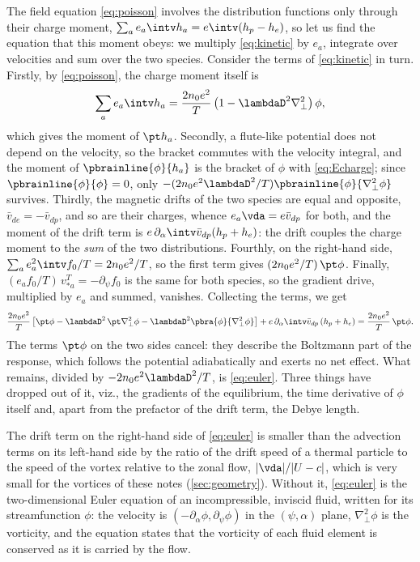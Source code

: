 The field equation \cref{eq:poisson} involves the distribution functions only through their charge moment, \(\sum_a e_a\intv h_a = e\intv(h_p - h_e)\), so let us find the equation that this moment obeys: we multiply \cref{eq:kinetic} by \(e_a\), integrate over velocities and sum over the two species. Consider the terms of \cref{eq:kinetic} in turn. Firstly, by \cref{eq:poisson}, the charge moment itself is
\begin{equation}
\sum_a e_a\intv h_a = \frac{2n_0e^2}{T}\left(1 - \lambdaD^2\nabla_\perp^2\right)\phi,
\label{eq:Echarge}
\end{equation}
which gives the moment of \(\pt h_a\). Secondly, a flute-like potential does not depend on the velocity, so the bracket commutes with the velocity integral, and the moment of \(\pbrainline{\phi}{h_a}\) is the bracket of \(\phi\) with \cref{eq:Echarge}; since \(\pbrainline{\phi}{\phi} = 0\), only \(-(2n_0e^2\lambdaD^2/T)\pbrainline{\phi}{\nabla_\perp^2\phi}\) survives. Thirdly, the magnetic drifts of the two species are equal and opposite, \(\bar v_{de} = -\bar v_{dp}\), and so are their charges, whence \(e_a\vda = e\bar v_{dp}\) for both, and the moment of the drift term is \(e\,\partial_\alpha\intv\bar v_{dp}(h_p + h_e)\): the drift couples the charge moment to the \textit{sum} of the two distributions. Fourthly, on the right-hand side, \(\sum_a e_a^2\intv f_0/T = 2n_0e^2/T\), so the first term gives \((2n_0e^2/T)\,\pt\phi\). Finally, \((e_af_0/T)\,v_{*a}^T = -\partial_\psi f_0\) is the same for both species, so the gradient drive, multiplied by \(e_a\) and summed, vanishes. Collecting the terms, we get
\begin{equation}
\frac{2n_0e^2}{T}\left[\pt\phi - \lambdaD^2\,\pt\nabla_\perp^2\phi - \lambdaD^2\pbra{\phi}{\nabla_\perp^2\phi}\right] + e\,\partial_\alpha\intv\bar v_{dp}\left(h_p + h_e\right) = \frac{2n_0e^2}{T}\,\pt\phi.
\label{eq:Ecollect}
\end{equation}
The terms \(\pt\phi\) on the two sides cancel: they describe the Boltzmann part of the response, which follows the potential adiabatically and exerts no net effect. What remains, divided by \(-2n_0e^2\lambdaD^2/T\), is \cref{eq:euler}. Three things have dropped out of it, viz., the gradients of the equilibrium, the time derivative of \(\phi\) itself and, apart from the prefactor of the drift term, the Debye length.

The drift term on the right-hand side of \cref{eq:euler} is smaller than the advection terms on its left-hand side by the ratio of the drift speed of a thermal particle to the speed of the vortex relative to the zonal flow, \(|\vda|/|U - c|\), which is very small for the vortices of these notes (\cref{sec:geometry}). Without it, \cref{eq:euler} is the two-dimensional Euler equation of an incompressible, inviscid fluid, written for its streamfunction \(\phi\): the velocity is \((-\partial_\alpha\phi, \partial_\psi\phi)\) in the \((\psi,\alpha)\) plane, \(\nabla_\perp^2\phi\) is the vorticity, and the equation states that the vorticity of each fluid element is conserved as it is carried by the flow.

